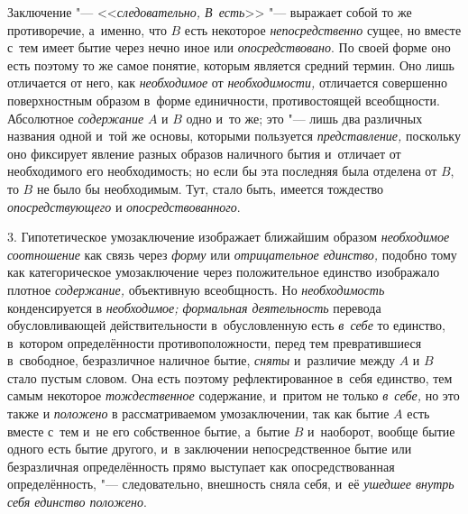 Заключение "--- <<{\em следовательно, В~есть}>>
"--- выражает собой то же противоречие, а~именно, что
$B$ есть некоторое {\em непосредственно}
сущее, но вместе с~тем имеет бытие через нечно иное или
{\em опосредствовано}.
По своей форме оно есть поэтому то же самое понятие, которым
является средний термин. Оно лишь отличается от него, как
{\em необходимое} от {\em необходимости,}
отличается совершенно поверхностным образом в~форме
единичности, противостоящей всеобщности. Абсолютное
{\em содержание} $A$ и $B$ одно и~то же;
это "--- лишь два различных названия одной и~той же основы,
которыми пользуется {\em представление,}
поскольку оно фиксирует явление разных образов наличного
бытия и~отличает от необходимого его необходимость; но если бы эта
последняя была отделена от $B$, то $B$ не было бы необходимым.
Тут, стало быть, имеется тождество {\em опосредствующего} и
{\em опосредствованного}.

3. Гипотетическое умозаключение изображает ближайшим образом
{\em необходимое соотношение}
как связь через {\em форму} или {\em отрицательное единство,}
подобно тому как категорическое умозаключение через
положительное единство изображало плотное
{\em содержание,} объективную всеобщность. Но {\em необходимость}
конденсируется в {\em необходимое; формальная деятельность}
перевода обусловливающей действительности в~обусловленную есть {\em в~себе} то
единство, в~котором определённости противоположности, перед тем
превратившиеся в~свободное, безразличное наличное бытие,
{\em сняты} и~различие между $A$ и $B$ стало пустым
словом. Она есть поэтому рефлектированное в~себя единство,
тем самым некоторое {\em тождественное}
содержание, и~притом не только {\em в~себе,} но это также и {\em положено} в
рассматриваемом умозаключении, так как бытие $A$ есть вместе с~тем
и~не его собственное бытие, а~бытие $B$ и~наоборот,
вообще бытие одного есть бытие другого, и~в заключении непосредственное
бытие или безразличная определённость прямо выступает как опосредствованная
определённость, "--- следовательно, внешность сняла себя, и~её
{\em ушедшее внутрь себя единство положено}.

